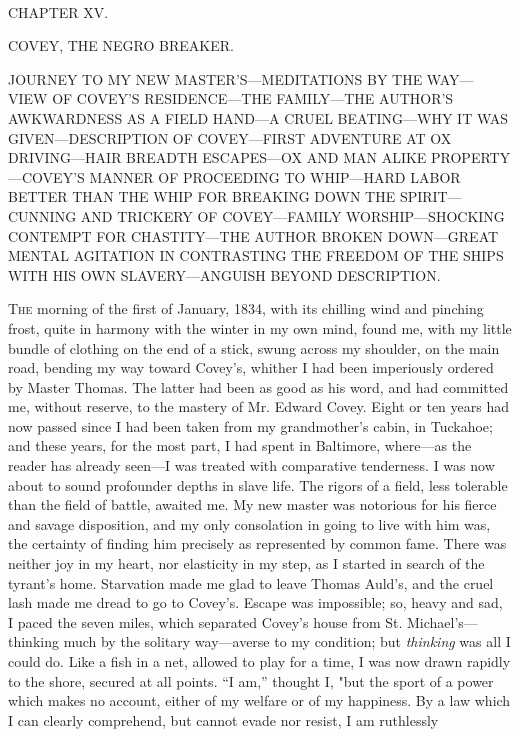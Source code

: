 {}

~

{CHAPTER XV.}

COVEY, THE NEGRO BREAKER.

{JOURNEY TO MY NEW MASTER'S---MEDITATIONS BY THE WAY---VIEW OF COVEY'S
RESIDENCE---THE FAMILY---THE AUTHOR'S AWKWARDNESS AS A FIELD HAND---A
CRUEL BEATING---WHY IT WAS GIVEN---DESCRIPTION OF COVEY---FIRST
ADVENTURE AT OX DRIVING---HAIR BREADTH ESCAPES---OX AND MAN ALIKE
PROPERTY---COVEY'S MANNER OF PROCEEDING TO WHIP---HARD LABOR BETTER THAN
THE WHIP FOR BREAKING DOWN THE SPIRIT---CUNNING AND TRICKERY OF
COVEY---FAMILY WORSHIP---SHOCKING CONTEMPT FOR CHASTITY---THE AUTHOR
BROKEN DOWN---GREAT MENTAL AGITATION IN CONTRASTING THE FREEDOM OF THE
SHIPS WITH HIS OWN SLAVERY---ANGUISH BEYOND DESCRIPTION.}

\textsc{The} morning of the first of January, 1834, with its chilling
wind and pinching frost, quite in harmony with the winter in my own
mind, found me, with my little bundle of clothing on the end of a stick,
swung across my shoulder, on the main road, bending my way toward
Covey's, whither I had been imperiously ordered by Master Thomas. The
latter had been as good as his word, and had committed me, without
reserve, to the mastery of Mr. Edward Covey. Eight or ten years had now
passed since I had been taken from my grandmother's cabin, in Tuckahoe;
and these years, for the most part, I had spent in Baltimore, where---as
the reader has already seen---I was treated with comparative tenderness.
I was now about to sound profounder depths in slave life. The {}rigors
of a field, less tolerable than the field of battle, awaited me. My new
master was notorious for his fierce and savage disposition, and my only
consolation in going to live with him was, the certainty of finding him
precisely as represented by common fame. There was neither joy in my
heart, nor elasticity in my step, as I started in search of the tyrant's
home. Starvation made me glad to leave Thomas Auld's, and the cruel lash
made me dread to go to Covey's. Escape was impossible; so, heavy and
sad, I paced the seven miles, which separated Covey's house from St.
Michael's---thinking much by the solitary way---averse to my condition;
but \emph{thinking} was all I could do. Like a fish in a net, allowed to
play for a time, I was now drawn rapidly to the shore, secured at all
points. ``I am,'' thought I, "but the sport of a power which makes no
account, either of my welfare or of my happiness. By a law which I can
clearly comprehend, but cannot evade nor resist, I am ruthlessly
